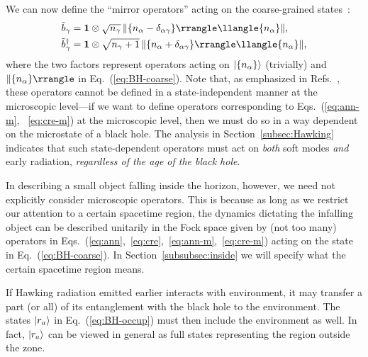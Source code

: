 \documentclass[12pt]{article}
\begin{document}
We can now define the ``mirror operators'' acting on the 
coarse-grained states~\cite{Papadodimas:2012aq,Papadodimas:2013jku,%
Papadodimas:2015jra}:
%
\begin{align}
  \tilde{b}_\gamma &= {\bf 1} \otimes \sqrt{n_\gamma}\, 
    \ketc{\{ n_\alpha - \delta_{\alpha\gamma} \}} 
    \brac{\{ n_\alpha \}},
\label{eq:ann-m}\\
  \tilde{b}_\gamma^\dagger &= {\bf 1} \otimes \sqrt{n_\gamma + 1}\, 
    \ketc{\{ n_\alpha + \delta_{\alpha\gamma} \}} 
    \brac{\{ n_\alpha \}},
\label{eq:cre-m}
\end{align}
%
where the two factors represent operators acting on 
$| \{ n_\alpha \} \rangle$ (trivially) and $\ketc{\{ n_\alpha \}}$ 
in Eq.~(\ref{eq:BH-coarse}).  Note that, as emphasized 
in Refs.~\cite{Papadodimas:2012aq,Papadodimas:2013jku,%
Papadodimas:2015jra}, these operators cannot be defined in 
a state-independent manner at the microscopic level---if we 
want to define operators corresponding to Eqs.~(\ref{eq:ann-m},%
~\ref{eq:cre-m}) at the microscopic level, then we must do so in 
a way dependent on the microstate of a black hole.  The analysis 
in Section~\ref{subsec:Hawking} indicates that such state-dependent 
operators must act on {\it both} soft modes {\it and} early 
radiation, {\it regardless of the age of the black hole}.

In describing a small object falling inside the horizon, however, 
we need not explicitly consider microscopic operators.  This is 
because as long as we restrict our attention to a certain spacetime 
region, the dynamics dictating the infalling object can be described 
unitarily in the Fock space given by (not too many) operators in 
Eqs.~(\ref{eq:ann},~\ref{eq:cre},~\ref{eq:ann-m},~\ref{eq:cre-m}) 
acting on the state in Eq.~(\ref{eq:BH-coarse}).  In 
Section~\ref{subsubsec:inside} we will specify what 
the certain spacetime region means.

If Hawking radiation emitted earlier interacts with environment, it 
may transfer a part (or all) of its entanglement with the black hole 
to the environment.  The states $| r_a \rangle$ in Eq.~(\ref{eq:BH-occup}) 
must then include the environment as well.  In fact, $| r_a \rangle$ can 
be viewed in general as full states representing the region outside 
the zone.
\end{document}
